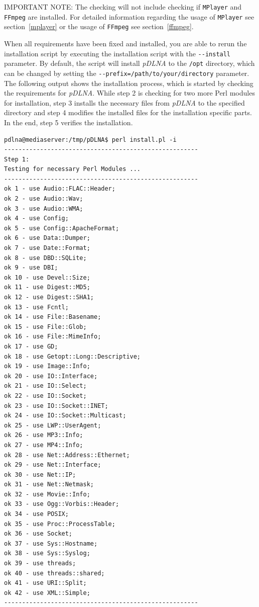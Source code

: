 \documentclass[a4paper,oneside,10pt]{report}
\newenvironment{colframecmd}{%
  \begin{Sbox}
    \begin{minipage}{.99\columnwidth}
}{%
  \end{minipage}
  \end{Sbox}
  \begin{center}
    \fcolorbox{black}{LightSteelBlue}{\TheSbox}
  \end{center}
}
\newenvironment{colframeimportantnote}{%
  \begin{Sbox}
    \begin{minipage}{.99\columnwidth}
}{%
  \end{minipage}
  \end{Sbox}
  \begin{center}
    \fcolorbox{black}{Orange}{\TheSbox}
  \end{center}
}
\begin{document}
\begin{colframeimportantnote}
\textsc{IMPORTANT NOTE:} The checking will not include checking if \verb|MPlayer| and \verb|FFmpeg| are installed. For detailed information regarding the usage of \verb|MPlayer| see section~\ref{mplayer} or the usage of \verb|FFmpeg| see section~\ref{ffmpeg}.
\end{colframeimportantnote}

When all requirements have been fixed and installed, you are able to rerun the installation script by executing the installation script with the \verb|--install| parameter. By default, the script will install {\em pDLNA} to the \verb|/opt| directory, which can be changed by setting the \verb|--prefix=/path/to/your/directory| parameter. The following output shows the installation process, which is started by checking the requirements for {\em pDLNA}. While step 2 is checking for two more Perl modules for installation, step 3 installs the necessary files from {\em pDLNA} to the specified directory and step 4 modifies the installed files for the installation specific parts. In the end, step 5 verifies the installation.
\begin{colframecmd}
\begin{verbatim}
pdlna@mediaserver:/tmp/pDLNA$ perl install.pl -i
------------------------------------------------------
Step 1:
Testing for necessary Perl Modules ...
------------------------------------------------------
ok 1 - use Audio::FLAC::Header;
ok 2 - use Audio::Wav;
ok 3 - use Audio::WMA;
ok 4 - use Config;
ok 5 - use Config::ApacheFormat;
ok 6 - use Data::Dumper;
ok 7 - use Date::Format;
ok 8 - use DBD::SQLite;
ok 9 - use DBI;
ok 10 - use Devel::Size;
ok 11 - use Digest::MD5;
ok 12 - use Digest::SHA1;
ok 13 - use Fcntl;
ok 14 - use File::Basename;
ok 15 - use File::Glob;
ok 16 - use File::MimeInfo;
ok 17 - use GD;
ok 18 - use Getopt::Long::Descriptive;
ok 19 - use Image::Info;
ok 20 - use IO::Interface;
ok 21 - use IO::Select;
ok 22 - use IO::Socket;
ok 23 - use IO::Socket::INET;
ok 24 - use IO::Socket::Multicast;
ok 25 - use LWP::UserAgent;
ok 26 - use MP3::Info;
ok 27 - use MP4::Info;
ok 28 - use Net::Address::Ethernet;
ok 29 - use Net::Interface;
ok 30 - use Net::IP;
ok 31 - use Net::Netmask;
ok 32 - use Movie::Info;
ok 33 - use Ogg::Vorbis::Header;
ok 34 - use POSIX;
ok 35 - use Proc::ProcessTable;
ok 36 - use Socket;
ok 37 - use Sys::Hostname;
ok 38 - use Sys::Syslog;
ok 39 - use threads;
ok 40 - use threads::shared;
ok 41 - use URI::Split;
ok 42 - use XML::Simple;
------------------------------------------------------
\end{verbatim}
\end{colframecmd}
\end{document}
